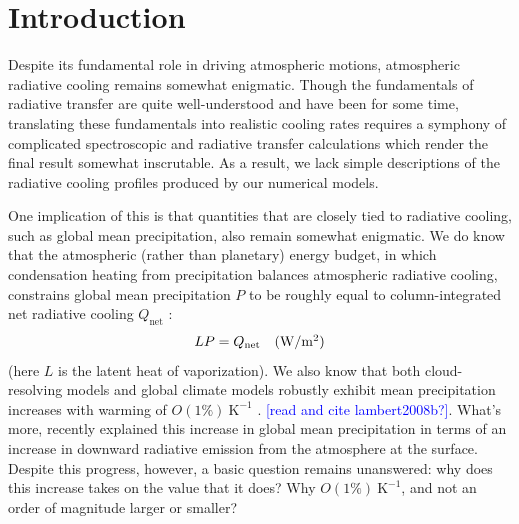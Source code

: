 \documentclass[10pt]{article}
\newcommand{\comment}[1]{\textcolor{blue}{[{#1}]}}
\newcommand{\beqn}{\begin{equation}}
\newcommand{\eeqn}{\end{equation}}
\newcommand{\Qnet}{\ensuremath{Q_\mathrm{net}}}
\newcommand{\Wmsq}{\ensuremath{\mathrm{W/m^2}}}
\newcommand{\Kinverse}{\ensuremath{\mathrm{K^{-1}}}}
\begin{document}
\section {Introduction}
Despite its fundamental role in driving atmospheric motions, atmospheric radiative cooling remains somewhat enigmatic. Though the fundamentals of radiative transfer are quite well-understood and have been for some time, translating these fundamentals into realistic cooling rates requires a symphony of complicated spectroscopic and radiative transfer calculations which render the final result somewhat inscrutable. As a result, we lack simple descriptions of the radiative cooling profiles produced by our numerical models.


One implication of this is that quantities that are closely tied to radiative cooling, such as global mean precipitation, also remain somewhat enigmatic. We do know that the atmospheric (rather than planetary) energy budget, in which condensation heating from precipitation balances atmospheric radiative cooling, constrains global mean precipitation $P$ to be roughly equal to column-integrated net radiative cooling $\Qnet$ \citep{ogorman2012,allen2002}:
\beqn
	LP = \Qnet \quad \mbox{(\Wmsq)} \label{rad_precip_constraint}
\eeqn
(here $L$ is the latent heat of vaporization). We also know that both cloud-resolving models and global climate models robustly exhibit  mean precipitation increases with warming of $O(1\%)\ \Kinverse$  \citep{stephens2008, lambert2008, held2006}. \comment{read and cite lambert2008b?}. What's more, \cite{pendergrass2014} recently explained this increase in global mean precipitation in terms of an increase in downward radiative emission from the atmosphere at the surface. Despite this progress, however, a basic question remains unanswered: why does this increase takes on the value that it does? Why $O(1\%)\ \Kinverse$, and not an order of magnitude larger or smaller?
\end{document}
